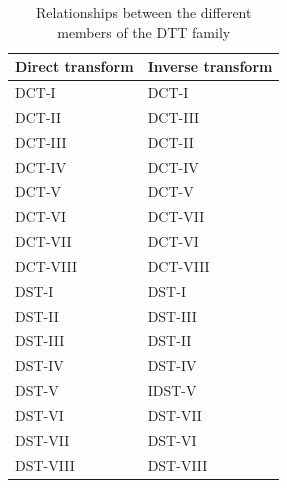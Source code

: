 \documentclass[11pt,a4paper,openright,twoside]{book}
\numberwithin{equation}{section} %
\numberwithin{figure}{section} %
\numberwithin{table}{section} %
\begin{document}
\begin{table}[tb]
	\centering
	\small
	\begin{tabular}{l|l}
		Direct transform & Inverse transform \\
		\hline\hline
		\hspace{0.5cm} DCT-I    & \hspace{0.75cm} DCT-I    \\
		\hspace{0.5cm} DCT-II   & \hspace{0.75cm} DCT-III  \\
		\hspace{0.5cm} DCT-III  & \hspace{0.75cm} DCT-II   \\
		\hspace{0.5cm} DCT-IV   & \hspace{0.75cm} DCT-IV   \\
		\hspace{0.5cm} DCT-V    & \hspace{0.75cm} DCT-V    \\
		\hspace{0.5cm} DCT-VI   & \hspace{0.75cm} DCT-VII  \\
		\hspace{0.5cm} DCT-VII  & \hspace{0.75cm} DCT-VI   \\
		\hspace{0.5cm} DCT-VIII & \hspace{0.75cm} DCT-VIII \\
		\hline
		\hspace{0.5cm} DST-I    & \hspace{0.75cm} DST-I    \\
		\hspace{0.5cm} DST-II   & \hspace{0.75cm} DST-III  \\
		\hspace{0.5cm} DST-III  & \hspace{0.75cm} DST-II   \\
		\hspace{0.5cm} DST-IV   & \hspace{0.75cm} DST-IV   \\
		\hspace{0.5cm} DST-V    & \hspace{0.75cm} IDST-V   \\
		\hspace{0.5cm} DST-VI   & \hspace{0.75cm} DST-VII  \\
		\hspace{0.5cm} DST-VII  & \hspace{0.75cm} DST-VI   \\
		\hspace{0.5cm} DST-VIII & \hspace{0.75cm} DST-VIII \\
	\end{tabular}
	\caption{Relationships between the different members of the \acs{DTT}
	family}
	\label{tab:dtt_relationships}
\end{table}
\end{document}
